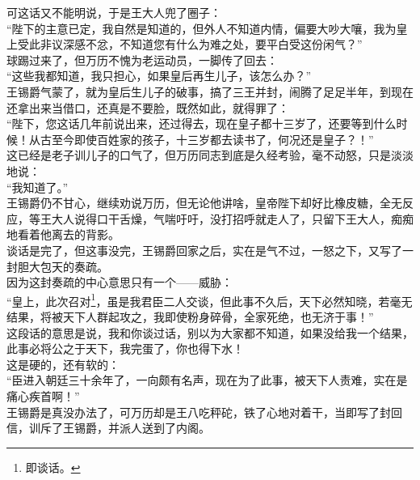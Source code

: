 \begin{multicols}{\theparacolNo}
可这话又不能明说，于是王大人兜了圈子：\\

“陛下的主意已定，我自然是知道的，但外人不知道内情，偏要大吵大嚷，我为皇上受此非议深感不忿，不知道您有什么为难之处，要平白受这份闲气？”\\

球踢过来了，但万历不愧为老运动员，一脚传了回去：\\

“这些我都知道，我只担心，如果皇后再生儿子，该怎么办？”\\

王锡爵气蒙了，就为皇后生儿子的破事，搞了三王并封，闹腾了足足半年，到现在还拿出来当借口，还真是不要脸，既然如此，就得罪了：\\

“陛下，您这话几年前说出来，还过得去，现在皇子都十三岁了，还要等到什么时候！从古至今即使百姓家的孩子，十三岁都去读书了，何况还是皇子？！”\\

这已经是老子训儿子的口气了，但万历同志到底是久经考验，毫不动怒，只是淡淡地说：\\

“我知道了。”\\

王锡爵仍不甘心，继续劝说万历，但无论他讲啥，皇帝陛下却好比橡皮糖，全无反应，等王大人说得口干舌燥，气喘吁吁，没打招呼就走人了，只留下王大人，痴痴地看着他离去的背影。\\

谈话是完了，但这事没完，王锡爵回家之后，实在是气不过，一怒之下，又写了一封胆大包天的奏疏。\\

因为这封奏疏的中心意思只有一个——威胁：\\

“皇上，此次召对\footnote{即谈话。}，虽是我君臣二人交谈，但此事不久后，天下必然知晓，若毫无结果，将被天下人群起攻之，我即使粉身碎骨，全家死绝，也无济于事！”\\

这段话的意思是说，我和你谈过话，别以为大家都不知道，如果没给我一个结果，此事必将公之于天下，我完蛋了，你也得下水！\\

这是硬的，还有软的：\\

“臣进入朝廷三十余年了，一向颇有名声，现在为了此事，被天下人责难，实在是痛心疾首啊！”\\

王锡爵是真没办法了，可万历却是王八吃秤砣，铁了心地对着干，当即写了封回信，训斥了王锡爵，并派人送到了内阁。\\


\end{multicols}
